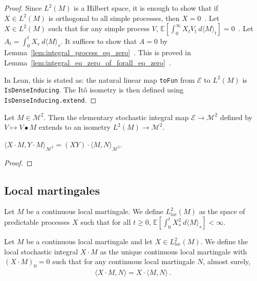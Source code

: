 \begin{proof}
Since $L^2(M)$ is a Hilbert space, it is enough to show that if $X \in L^2(M)$ is orthogonal to all simple processes, then $X = 0$~.
Let $X \in L^2(M)$ such that for any simple process $V$, $\mathbb{E}\left[ \int_0^{\infty} X_t V_t \: d\langle M \rangle_t \right] = 0$~.
Let $A_t = \int_0^t X_s \: d\langle M \rangle_s$.
It suffices to show that $A = 0$ by Lemma~\ref{lem:integral_process_eq_zero}~.
This is proved in Lemma~\ref{lem:integral_eq_zero_of_forall_eq_zero}~.

In Lean, this is stated as: the natural linear map \texttt{toFun} from $\mathcal{E}$ to $L^2(M)$
is \texttt{IsDenseInducing}. The Itô isometry is then defined using \texttt{IsDenseInducing.extend}.
\end{proof}


\begin{definition}\label{def:itoIsometry}
Let $M \in \mathcal{M}^2$. Then the elementary stochastic integral map $\mathcal{E} \to \mathcal{M}^2$ defined by $V \mapsto V \bullet M$ extends to an isometry $L^2(M) \to \mathcal{M}^2$.
\end{definition}


\begin{lemma}\label{lem:inner_itoIsometry}
$\langle X \cdot M, Y \cdot M \rangle_{\mathcal{M}^2} = (XY) \cdot \langle M, N \rangle_{\mathcal{M}^2}$.
\end{lemma}

\begin{proof}

\end{proof}


\subsection{Local martingales}

\begin{definition}[$L^2_{loc}(M)$]\label{def:L2locM}
Let $M$ be a continuous local martingale.
We define $L^2_{loc}(M)$ as the space of predictable processes $X$ such that for all $t \ge 0$, $\mathbb{E}\left[ \int_0^t X_s^2 \: d\langle M \rangle_s \right] < \infty$.
\end{definition}


\begin{definition}\label{def:locStochIntegral}
Let $M$ be a continuous local martingale and let $X \in L^2_{loc}(M)$.
We define the local stochastic integral $X \cdot M$ as the unique continuous local martingale with $(X \cdot M)_0 = 0$ such that for any continuous local martingale $N$, almost surely,
\begin{align*}
  \langle X \cdot M, N \rangle = X \cdot \langle M, N \rangle
  \: .
\end{align*}
\end{definition}


